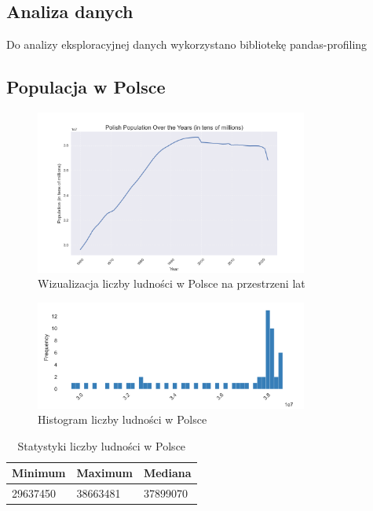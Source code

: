 \documentclass[11pt]{article}
\begin{document}
\subsection{Analiza danych}
Do analizy eksploracyjnej danych wykorzystano bibliotekę pandas-profiling\cite{pp}
\subsection{Populacja w Polsce}
\begin{figure}[H]
        \centering
        \includegraphics[width=0.8\textwidth]{polish_population_over_the_years.png}
        \caption{Wizualizacja liczby ludności w Polsce na przestrzeni lat}
\end{figure}
\begin{figure}[H]
        \centering
        \includegraphics[width=0.8\textwidth]{images/histogram_populacja.png}
        \caption{Histogram liczby ludności w Polsce}
\end{figure}
\begin{table}[H]
        \centering
        \begin{tabular}{|l|l|l|}
        \hline
        Minimum & Maximum & Mediana \\ \hline
        29637450 & 38663481 & 37899070 \\ \hline
        \end{tabular}
        \caption{Statystyki liczby ludności w Polsce}
        \end{table}
\end{document}
